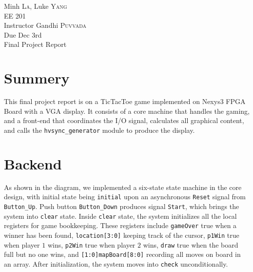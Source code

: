 \documentclass[UTF8,12pt,letterpaper,oneside]{amsart}
\begin{document}
\noindent Minh \textsc{La}, Luke \textsc{Yang}\\
EE 201\\
Instructor Gandhi \textsc{Puvvada}\\
Due Dec $3$rd\\
Final Project Report


\section{Summery}

This final project report is on a TicTacToe game implemented on Nexys3 FPGA Board with a VGA display. It consists of a core machine that handles the gaming, and a front-end that coordinates the I/O signal, calculates all graphical content, and calls the \texttt{hvsync\_generator} module to produce the display. 

\section{Backend}




As shown in the diagram, we implemented a six-state state machine in the core design, with initial state being \texttt{initial} upon an asynchronous \texttt{Reset} signal from \texttt{Button\_Up}. Push button \texttt{Button\_Down} produces signal \texttt{Start}, which brings the system into \texttt{clear} state. Inside \texttt{clear} state, the system initializes all the local registers for game bookkeeping. These registers include \texttt{gameOver} true when a winner has been found, \texttt{location[3:0]} keeping track of the cursor, \texttt{p1Win} true when player $1$ wins, \texttt{p2Win} true when player $2$ wins, \texttt{draw} true when the board full but no one wins, and \texttt{[1:0]mapBoard[8:0]} recording all moves on board in an array. After initialization, the system moves into \texttt{check} unconditionally.
\end{document}
